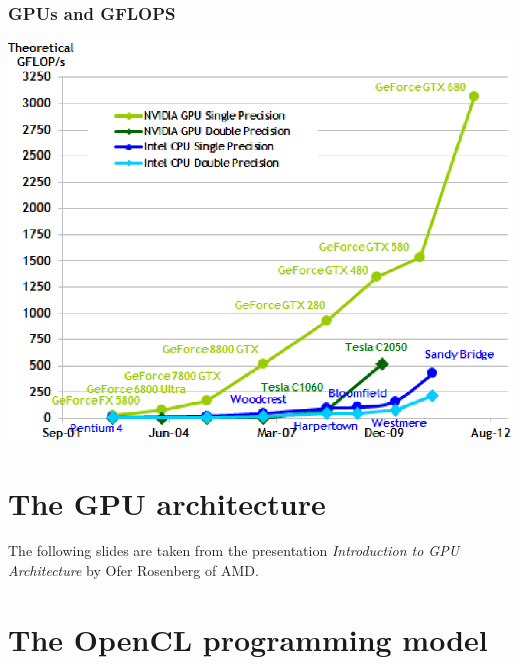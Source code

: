 \documentclass{beamer}
\begin{document}
\begin{frame}[fragile,t]
\frametitle{GPUs and GFLOPS}

\begin{center}
\includegraphics[height=43ex]{img/gpugflops.png}
\end  {center}

\end{frame}


\section{The GPU architecture}

\begin{frame}
	\tableofcontents[currentsection]
\end{frame}

\begin{frame}
  The following slides are taken from the presentation
  \textit{Introduction to GPU Architecture} by Ofer Rosenberg of AMD.
\end{frame}

{

}

\section{The OpenCL programming model}

\begin{frame}
	\tableofcontents[currentsection]
\end{frame}
\end{document}
